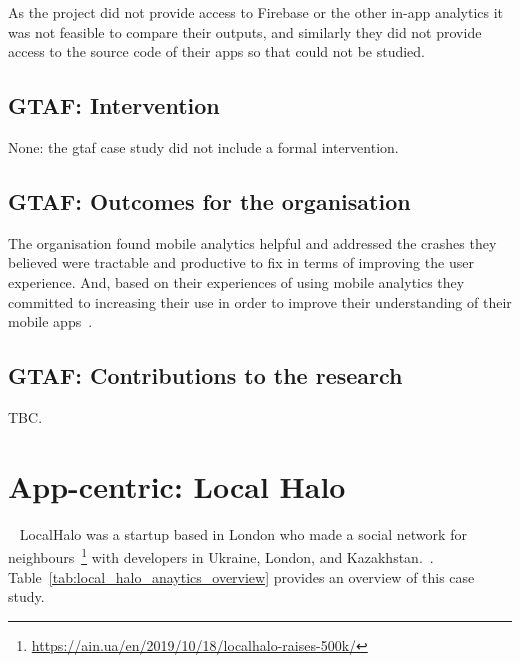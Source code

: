 As the project did not provide access to Firebase or the other in-app analytics it was not feasible to compare their outputs, and similarly they did not provide access to the source code of their apps so that could not be studied.

\subsection{GTAF: Intervention}
None: the \acrshort{gtaf} case study did not include a formal intervention.

\subsection{GTAF: Outcomes for the organisation}
The organisation found mobile analytics helpful and addressed the crashes they believed were tractable and productive to fix in terms of improving the user experience. And, based on their experiences of using mobile analytics they committed to increasing their use in order to improve their understanding of their mobile apps~.


\subsection{GTAF: Contributions to the research}
TBC.


\clearpage


\section{App-centric: Local Halo}~\label{case-study-overview-localhalo}
LocalHalo was a startup based in London who made a social network for neighbours~\footnote{\url{https://ain.ua/en/2019/10/18/localhalo-raises-500k/}} with developers in Ukraine, London, and Kazakhstan.~. 
Table~\ref{tab:local_halo_anaytics_overview} provides an overview of this case study.

